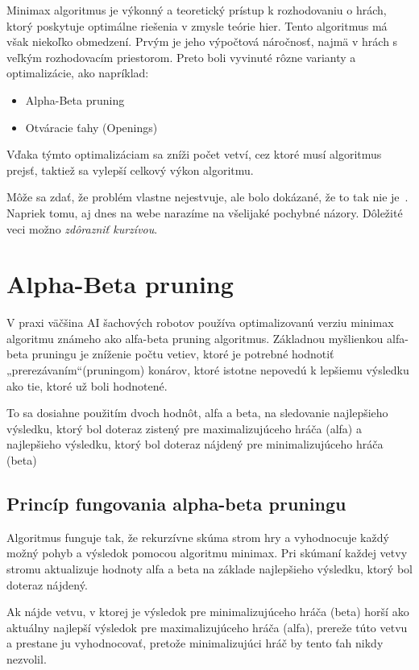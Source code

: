 \documentclass[10pt,twoside,slovak,a4paper]{article}
\begin{document}
Minimax algoritmus je výkonný a teoretický prístup k rozhodovaniu o hrách, ktorý poskytuje optimálne riešenia v zmysle teórie hier. Tento algoritmus má však niekoľko obmedzení. Prvým je jeho výpočtová náročnosť, najmä v hrách s veľkým rozhodovacím priestorom. Preto boli vyvinuté rôzne varianty a optimalizácie, ako napríklad:
\begin{itemize}
\item Alpha-Beta pruning
\item Otváracie ťahy (Openings)
\end{itemize}
Vďaka týmto optimalizáciam sa zníži počet vetví, cez ktoré musí algoritmus prejsť, taktiež sa vylepší celkový výkon algoritmu. 


Môže sa zdať, že problém vlastne nejestvuje\cite{Coplien:MPD}, ale bolo dokázané, že to tak nie je~\cite{Czarnecki:Staged, Czarnecki:Progress}. Napriek tomu, aj dnes na webe narazíme na všelijaké pochybné názory\cite{PLP-Framework}. Dôležité veci možno \emph{zdôrazniť kurzívou}.


\section{Alpha-Beta pruning} \label{alpha-beta}
V praxi väčšina AI šachových robotov používa optimalizovanú verziu minimax algoritmu známeho ako alfa-beta pruning algoritmus. Základnou myšlienkou alfa-beta pruningu je zníženie počtu vetiev, ktoré je potrebné hodnotiť „prerezávaním“(pruningom) konárov, ktoré istotne nepovedú k lepšiemu výsledku ako tie, ktoré už boli hodnotené. 

To sa dosiahne použitím dvoch hodnôt, alfa a beta, na sledovanie najlepšieho výsledku, ktorý bol doteraz zistený pre maximalizujúceho hráča (alfa) a najlepšieho výsledku, ktorý bol doteraz nájdený pre minimalizujúceho hráča (beta)

\subsection{Princíp fungovania alpha-beta pruningu} \label{principAlpha-beta}
Algoritmus funguje tak, že rekurzívne skúma strom hry a vyhodnocuje každý možný pohyb a výsledok pomocou algoritmu minimax. Pri skúmaní každej vetvy stromu aktualizuje hodnoty alfa a beta na základe najlepšieho výsledku, ktorý bol doteraz nájdený. 

Ak nájde vetvu, v ktorej je výsledok pre minimalizujúceho hráča (beta) horší ako aktuálny najlepší výsledok pre maximalizujúceho hráča (alfa), prereže túto vetvu a prestane ju vyhodnocovať, pretože minimalizujúci hráč by tento ťah nikdy nezvolil. 
\end{document}
